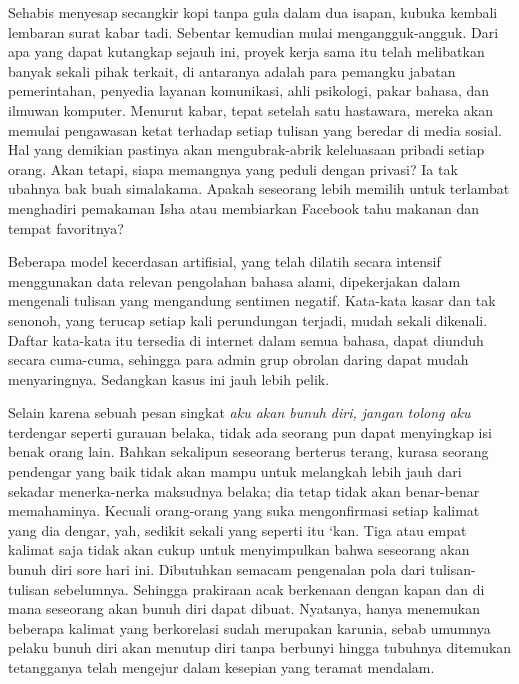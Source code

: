 \documentclass[smalldemyvopaper,11pt,twoside,onecolumn,openright,extrafontsizes]{memoir}
\begin{document}
Sehabis menyesap secangkir kopi tanpa gula dalam dua isapan, kubuka kembali lembaran surat kabar tadi. Sebentar kemudian mulai mengangguk-angguk. Dari apa yang dapat kutangkap sejauh ini, proyek kerja sama itu telah melibatkan banyak sekali pihak terkait, di antaranya adalah para pemangku jabatan pemerintahan, penyedia layanan komunikasi, ahli psikologi, pakar bahasa, dan ilmuwan komputer. Menurut kabar, tepat setelah satu hastawara, mereka akan memulai pengawasan ketat terhadap setiap tulisan yang beredar di media sosial. Hal yang demikian pastinya akan mengubrak-abrik keleluasaan pribadi setiap orang. Akan tetapi, siapa memangnya yang peduli dengan privasi? Ia tak ubahnya bak buah simalakama. Apakah seseorang lebih memilih untuk terlambat menghadiri pemakaman Isha atau membiarkan Facebook tahu makanan dan tempat favoritnya? %



Beberapa model kecerdasan artifisial, yang telah dilatih secara intensif menggunakan data relevan pengolahan bahasa alami, dipekerjakan dalam mengenali tulisan yang mengandung sentimen negatif. Kata-kata kasar dan tak senonoh, yang terucap setiap kali perundungan terjadi, mudah sekali dikenali. Daftar kata-kata itu tersedia di internet dalam semua bahasa, dapat diunduh secara cuma-cuma, sehingga para admin grup obrolan daring dapat mudah menyaringnya. Sedangkan kasus ini jauh lebih pelik.


Selain karena sebuah pesan singkat \textit{aku akan bunuh diri, jangan tolong aku} terdengar seperti gurauan belaka, tidak ada seorang pun dapat menyingkap isi benak orang lain. Bahkan sekalipun seseorang berterus terang, kurasa seorang pendengar yang baik tidak akan mampu untuk melangkah lebih jauh dari sekadar menerka-nerka maksudnya belaka; dia tetap tidak akan benar-benar memahaminya. Kecuali orang-orang yang suka mengonfirmasi setiap kalimat yang dia dengar, yah, sedikit sekali yang seperti itu `kan. Tiga atau empat kalimat saja tidak akan cukup untuk menyimpulkan bahwa seseorang akan bunuh diri sore hari ini. Dibutuhkan semacam pengenalan pola dari tulisan-tulisan sebelumnya. Sehingga prakiraan acak berkenaan dengan kapan dan di mana seseorang akan bunuh diri dapat dibuat. Nyatanya, hanya menemukan beberapa kalimat yang berkorelasi sudah merupakan karunia, sebab umumnya pelaku bunuh diri akan menutup diri tanpa berbunyi hingga tubuhnya ditemukan tetangganya telah mengejur dalam kesepian yang teramat mendalam.
\end{document}
